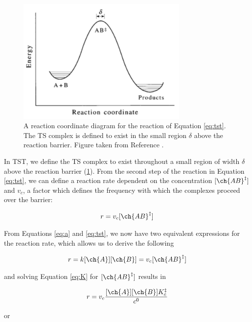\begin{figure}[htb]
    \centering
    \includegraphics[width=0.75\textwidth]{figures/TST-PES.png}
    \caption[A reaction coordinate diagram for a generic reaction.]{A reaction
      coordinate diagram for the reaction of Equation \ref{eq:tst}. The TS complex is
      defined to exist in the small region $\delta$ above the reaction
      barrier. Figure taken from Reference {\protect{}}.}
    \label{fig:tst-pes}
\end{figure}

In TST, we define the TS complex to exist throughout a small region of width $\delta$ above the reaction barrier (\ref{fig:tst-pes}). From the second step of the reaction in Equation \ref{eq:tst}, we can define a reaction rate dependent on the concentration $[\ch{AB}^\ddagger]$ and $v_c$, a factor which defines the frequency with which the complexes proceed over the barrier:

\begin{equation}
  r = v_c [\ch{AB}^\ddagger]
\end{equation}

From Equations \ref{eq:a} and \ref{eq:tst}, we now have two equivalent expressions for the reaction rate, which allows us to derive the following

\begin{equation}
  r = k[\ch{A}][\ch{B}] = v_c [\ch{AB}^\ddagger]
\end{equation}

\noindent and solving Equation \ref{eq:K} for $[\ch{AB}^\ddagger]$ results in


\begin{equation}
  r = v_c\frac{[\ch{A}][\ch{B}]K_c^\ddagger}{c^0}
\end{equation}

\noindent or

